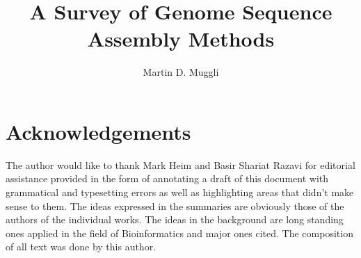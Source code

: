 \documentclass{llncs} %
\author{Martin D. Muggli}
\title{A Survey of Genome Sequence Assembly Methods}
\institute{Computer Science Department, Colorado State University}
\begin{document}
\maketitle













\section{Acknowledgements}
The author would like to thank Mark Heim and Basir Shariat Razavi for editorial assistance provided in the form of annotating a draft of this document with grammatical and typesetting errors as well as highlighting areas that didn't make sense to them. The ideas expressed in the summaries are obviously those of the authors of the individual works.  The ideas in the background are long standing ones applied in the field of Bioinformatics and major ones cited.  The composition of all text was done by this author.




\end{document}
